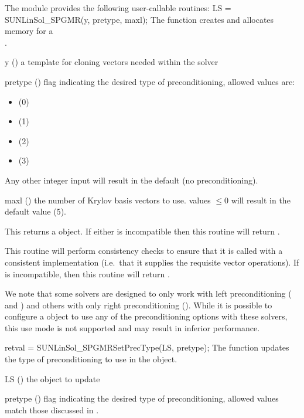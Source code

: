 The module {\sunlinsolspgmr} provides the following user-callable routines: 
{
  LS = SUNLinSol\_SPGMR(y, pretype, maxl);
}
{
  The function  creates and allocates memory for
  a {\spgmr} \\ \noindent {}.
}
{
  \begin{args}[pretype]
  \item[y] ()
    a template for cloning vectors needed within the solver
  \item[pretype] ()
    flag indicating the desired type of preconditioning, allowed
    values are:
    \begin{itemize}
    \item {} (0)
    \item {} (1)
    \item {} (2)
    \item {} (3)
    \end{itemize}
    Any other integer input will result in the default (no
    preconditioning).
  \item[maxl] ()
    the number of Krylov basis vectors to use.  values $\le0$ will
    result in the default value (5).
  \end{args}
}
{
  This returns a  object.  If either  is
  incompatible then this routine will return . 
}
{
  This routine will perform consistency checks to ensure that it is
  called with a consistent {\nvector} implementation (i.e.~that it
  supplies the requisite vector operations).  If  is
  incompatible, then this routine will return .
  
  We note that some {\sundials} solvers are designed to only work
  with left preconditioning ({\ida} and {\idas}) and others with only
  right preconditioning ({\kinsol}). While it is possible to configure
  a {\sunlinsolspgmr} object to use any of the preconditioning options
  with these solvers, this use mode is not supported and may result in
  inferior performance.
}
{
  retval = SUNLinSol\_SPGMRSetPrecType(LS, pretype);
}
{
  The function  updates the type of
  preconditioning to use in the {\sunlinsolspgmr} object.
}
{
  \begin{args}[pretype]
  \item[LS] ()
    the {\sunlinsolspgmr} object to update
  \item[pretype] ()
    flag indicating the desired type of preconditioning, allowed
    values match those discussed in .
  \end{args}
}
